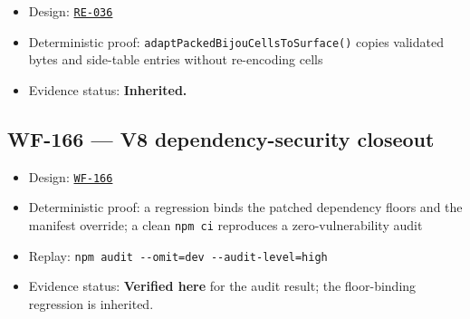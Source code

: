 \begin{itemize}
\tightlist
\item
  Design: \href{https://github.com/flyingrobots/bijou/blob/cbd70612140e7a450d764b3c7be1c6af878b99bc/docs/design/RE-036-packed-bijou-cells-surface-adapter.md}{\texttt{R\allowbreak{}E\allowbreak{}-\allowbreak{}0\allowbreak{}3\allowbreak{}6}}
\item
  Deterministic proof: \texttt{a\allowbreak{}d\allowbreak{}a\allowbreak{}p\allowbreak{}t\allowbreak{}P\allowbreak{}a\allowbreak{}c\allowbreak{}k\allowbreak{}e\allowbreak{}d\allowbreak{}B\allowbreak{}i\allowbreak{}j\allowbreak{}o\allowbreak{}u\allowbreak{}C\allowbreak{}e\allowbreak{}l\allowbreak{}l\allowbreak{}s\allowbreak{}T\allowbreak{}o\allowbreak{}S\allowbreak{}u\allowbreak{}r\allowbreak{}f\allowbreak{}a\allowbreak{}c\allowbreak{}e\allowbreak{}(\allowbreak{})} copies validated bytes and side-table entries without re-encoding cells
\item
  Evidence status: \textbf{Inherited.}
\end{itemize}

\subsection{WF-166 --- V8 dependency-security closeout}\label{record-262-wf-166-v8-dependency-security-closeout}

\begin{itemize}
\tightlist
\item
  Design: \href{https://github.com/flyingrobots/bijou/blob/cbd70612140e7a450d764b3c7be1c6af878b99bc/docs/design/WF-166-v8-dependency-security-closeout.md}{\texttt{W\allowbreak{}F\allowbreak{}-\allowbreak{}1\allowbreak{}6\allowbreak{}6}}
\item
  Deterministic proof: a regression binds the patched dependency floors and the manifest override; a clean \texttt{n\allowbreak{}p\allowbreak{}m\allowbreak{} \allowbreak{}c\allowbreak{}i} reproduces a zero-vulnerability audit
\item
  Replay: \texttt{n\allowbreak{}p\allowbreak{}m\allowbreak{} \allowbreak{}a\allowbreak{}u\allowbreak{}d\allowbreak{}i\allowbreak{}t\allowbreak{} \allowbreak{}-\allowbreak{}-\allowbreak{}o\allowbreak{}m\allowbreak{}i\allowbreak{}t\allowbreak{}=\allowbreak{}d\allowbreak{}e\allowbreak{}v\allowbreak{} \allowbreak{}-\allowbreak{}-\allowbreak{}a\allowbreak{}u\allowbreak{}d\allowbreak{}i\allowbreak{}t\allowbreak{}-\allowbreak{}l\allowbreak{}e\allowbreak{}v\allowbreak{}e\allowbreak{}l\allowbreak{}=\allowbreak{}h\allowbreak{}i\allowbreak{}g\allowbreak{}h}
\item
  Evidence status: \textbf{Verified here} for the audit result; the floor-binding regression is inherited.
\end{itemize}

